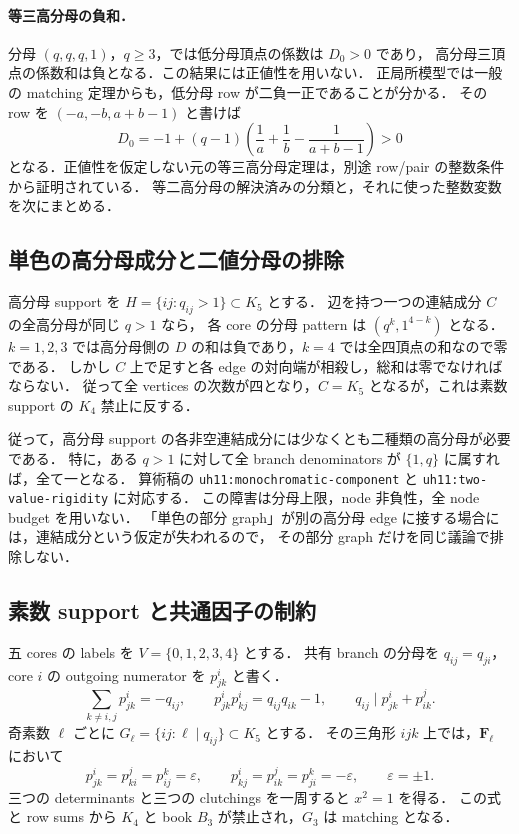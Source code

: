 \paragraph{等三高分母の負和．}
分母 $(q,q,q,1)$，$q\geq3$，では低分母頂点の係数は $D_0>0$ であり，
高分母三頂点の係数和は負となる．この結果には正値性を用いない．
正局所模型では一般の matching 定理からも，低分母 row が二負一正であることが分かる．
その row を $(-a,-b,a+b-1)$ と書けば
\[
 D_0=-1+(q-1)\left(\frac1a+\frac1b-\frac1{a+b-1}\right)>0
\]
となる．正値性を仮定しない元の等三高分母定理は，別途 row/pair の整数条件から証明されている．
等二高分母の解決済みの分類と，それに使った整数変数を次にまとめる．



\subsection{単色の高分母成分と二値分母の排除}

高分母 support を $H=\{ij:q_{ij}>1\}\subset K_5$ とする．
辺を持つ一つの連結成分 $C$ の全高分母が同じ $q>1$ なら，
各 core の分母 pattern は $(q^k,1^{4-k})$ となる．
$k=1,2,3$ では高分母側の $D$ の和は負であり，$k=4$ では全四頂点の和なので零である．
しかし $C$ 上で足すと各 edge の対向端が相殺し，総和は零でなければならない．
従って全 vertices の次数が四となり，$C=K_5$ となるが，これは素数 support の
$K_4$ 禁止に反する．

従って，高分母 support の各非空連結成分には少なくとも二種類の高分母が必要である．
特に，ある $q>1$ に対して全 branch denominators が $\{1,q\}$ に属すれば，全て一となる．
算術稿の \texttt{uh11:monochromatic-component} と
\texttt{uh11:two-value-rigidity} に対応する．
この障害は分母上限，node 非負性，全 node budget を用いない．
「単色の部分 graph」が別の高分母 edge に接する場合には，連結成分という仮定が失われるので，
その部分 graph だけを同じ議論で排除しない．

\subsection{素数 support と共通因子の制約}

五 cores の labels を $V=\{0,1,2,3,4\}$ とする．
共有 branch の分母を $q_{ij}=q_{ji}$，core $i$ の outgoing numerator を $p^i_{jk}$ と書く．
\[
 \sum_{k\ne i,j}p^i_{jk}=-q_{ij},\qquad
 p^i_{jk}p^i_{kj}=q_{ij}q_{ik}-1,\qquad
 q_{ij}\mid p^i_{jk}+p^j_{ik}.
\]
奇素数 $\ell$ ごとに $G_\ell=\{ij:\ell\mid q_{ij}\}\subset K_5$ とする．
その三角形 $ijk$ 上では，$\mathbf F_\ell$ において
\[
 p^i_{jk}=p^j_{ki}=p^k_{ij}=\varepsilon,\qquad
 p^i_{kj}=p^j_{ik}=p^k_{ji}=-\varepsilon,
 \qquad\varepsilon=\pm1.
\]
三つの determinants と三つの clutchings を一周すると $x^2=1$ を得る．
この式と row sums から $K_4$ と book $B_3$ が禁止され，$G_3$ は matching となる．

